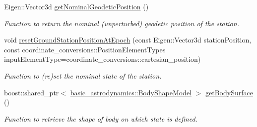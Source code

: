 \begin{DoxyCompactItemize}
Eigen\+::\+Vector3d \hyperlink{classtudat_1_1ground__stations_1_1GroundStationState_a33bc2b3d84acddff0bb2bd94d6b6e272}{get\+Nominal\+Geodetic\+Position} ()
\begin{DoxyCompactList}\small\item\em Function to return the nominal (unperturbed) geodetic position of the station. \end{DoxyCompactList}\item 
void \hyperlink{classtudat_1_1ground__stations_1_1GroundStationState_a8974c59ff3436e23fcd8302536c21a38}{reset\+Ground\+Station\+Position\+At\+Epoch} (const Eigen\+::\+Vector3d station\+Position, const coordinate\+\_\+conversions\+::\+Position\+Element\+Types input\+Element\+Type=coordinate\+\_\+conversions\+::cartesian\+\_\+position)
\begin{DoxyCompactList}\small\item\em Function to (re)set the nominal state of the station. \end{DoxyCompactList}\item 
boost\+::shared\+\_\+ptr$<$ \hyperlink{classtudat_1_1basic__astrodynamics_1_1BodyShapeModel}{basic\+\_\+astrodynamics\+::\+Body\+Shape\+Model} $>$ \hyperlink{classtudat_1_1ground__stations_1_1GroundStationState_a6676b031478c2d73a226ee5789d953d3}{get\+Body\+Surface} ()
\begin{DoxyCompactList}\small\item\em Function to retrieve the shape of body on which state is defined. \end{DoxyCompactList}\end{DoxyCompactItemize}

